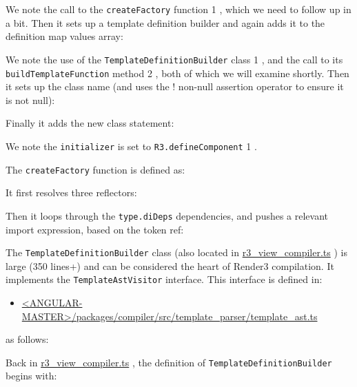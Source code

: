 

We note the call to the
\texttt{createFactory}
function
1
, which we need to follow up in a bit.
Then it sets up a template definition builder and again adds it to the definition map
values array:



We note the use of the
\texttt{TemplateDefinitionBuilder}
class
1
, and the call to its
\texttt{buildTemplateFunction}
method
2
, both of which we will examine shortly. Then it
sets up the class name (and uses the ! non-null assertion operator to ensure it is not
null):



Finally it adds the new class statement:



We note the
\texttt{initializer}
is set to
\texttt{R3.defineComponent}
1
.

The
\texttt{createFactory}
function is defined as:



It first resolves three reflectors:



Then it loops through the
\texttt{type.diDeps}
dependencies, and pushes a relevant import
expression, based on the token ref:



The
\texttt{TemplateDefinitionBuilder}
class (also located in
\url{r3_view_compiler.ts}
) is large
(350 lines+) and can be considered the heart of Render3 compilation. It implements
the
\texttt{TemplateAstVisitor}
interface. This interface is defined in:

\begin{itemize}
  \item \href{https://github.com/angular/angular/blob/master/packages/compiler/src/template_parser/template_ast.ts}
        {<ANGULAR-MASTER>/packages/compiler/src/template\_parser/template\_ast.ts}
\end{itemize}

as follows:



Back in
\url{r3_view_compiler.ts}
, the definition of
\texttt{TemplateDefinitionBuilder}
begins
with:

